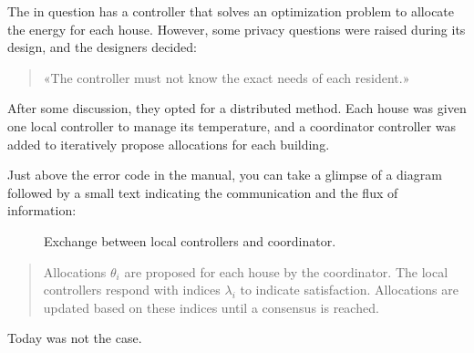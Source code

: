 \documentclass[../main.tex]{subfiles}
\begin{document}
The \dhn{} in question has a controller that solves an optimization problem to allocate the energy for each house.
However, some privacy questions were raised during its design, and the designers decided:
\begin{quote}
  «The controller must not know the exact needs of each resident.»
\end{quote}

After some discussion, they opted for a distributed method.
Each house was given one local controller to manage its temperature, and a coordinator controller was added to iteratively propose allocations for each building.

Just above the error code in the manual, you can take a glimpse of a diagram followed by a small text indicating the communication and the flux of information:
\begin{figure}[H]
  \centering
  \caption{Exchange between local controllers and coordinator.}\label{fig:ex_exchange_agents}
\end{figure}

\begin{quote}
  \raggedright
  Allocations $\theta_{i}$ are proposed for each house by the coordinator.
  The local controllers respond with indices $\lambda_{i}$ to indicate satisfaction. Allocations are updated based on these indices until a consensus is reached.
\end{quote}
Today was not the case.
\end{document}
